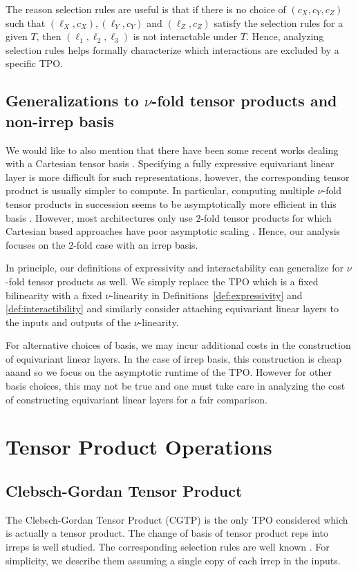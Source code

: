\documentclass{article}
\theoremstyle{definition}
\theoremstyle{remark}
\begin{document}
The reason selection rules are useful is that if there is no choice of $(c_X,c_Y,c_Z)$ such that $(\ell_X,c_X), (\ell_Y,c_Y)$ and $(\ell_Z,c_Z)$ satisfy the selection rules for a given $T$, then $(\ell_1,\ell_2,\ell_3)$ is not interactable under $T$. Hence, analyzing selection rules helps formally characterize which interactions are excluded by a specific TPO.

\subsection{Generalizations to $\nu$-fold tensor products and non-irrep basis}
\label{sec:cartesian_basis}
We would like to also mention that there have been some recent works dealing with a Cartesian tensor basis \citep{shao2024high,zaverkinhigher}. Specifying a fully expressive equivariant linear layer is more difficult for such representations, however, the corresponding tensor product is usually simpler to compute. In particular, computing multiple $\nu$-fold tensor products in succession seems to be asymptotically more efficient in this basis \citep{zaverkinhigher}. However, most architectures only use $2$-fold tensor products for which Cartesian based approaches have poor asymptotic scaling \citep{zaverkinhigher}. Hence, our analysis focuses on the $2$-fold case with an irrep basis.

In principle, our definitions of expressivity and interactability can generalize for $\nu$-fold tensor products as well. We simply replace the TPO which is a fixed bilinearity with a fixed $\nu$-linearity in Definitions~\ref{def:expressivity} and \ref{def:interactibility} and similarly consider attaching equivariant linear layers to the inputs and outputs of the $\nu$-linearity.

For alternative choices of basis, we may incur additional costs in the construction of equivariant linear layers. In the case of irrep basis, this construction is cheap aaand so we focus on the asymptotic runtime of the TPO. However for other basis choices, this may not be true and one must take care in analyzing the cost of constructing equivariant linear layers for a fair comparison.

\section{Tensor Product Operations}
\label{sec:TP_ops}
\subsection{Clebsch-Gordan Tensor Product}
\label{sec:CGTP}
The Clebsch-Gordan Tensor Product (CGTP) is the only TPO considered which is actually a tensor product. The change of basis of tensor product reps into irreps is well studied. The corresponding selection rules are well known \citep{varshalovich1988quantum}. For simplicity, we describe them assuming a single copy of each irrep in the inputs.
\end{document}
